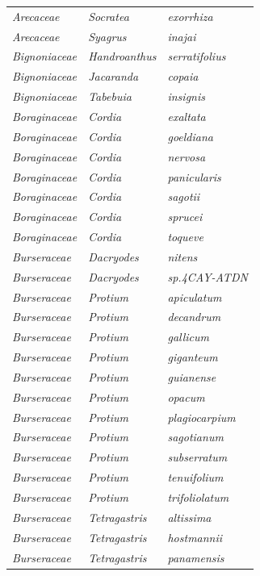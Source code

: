 \documentclass[fleqn,10pt]{ArtEcoFoG} %
\begin{document}
\begin{table}[t]
\begin{tabular}{lll}
\em{Arecaceae} & \em{Socratea} & \em{exorrhiza}\\
\em{Arecaceae} & \em{Syagrus} & \em{inajai}\\
\em{Bignoniaceae} & \em{Handroanthus} & \em{serratifolius}\\
\addlinespace
\em{Bignoniaceae} & \em{Jacaranda} & \em{copaia}\\
\em{Bignoniaceae} & \em{Tabebuia} & \em{insignis}\\
\em{Boraginaceae} & \em{Cordia} & \em{exaltata}\\
\em{Boraginaceae} & \em{Cordia} & \em{goeldiana}\\
\em{Boraginaceae} & \em{Cordia} & \em{nervosa}\\
\addlinespace
\em{Boraginaceae} & \em{Cordia} & \em{panicularis}\\
\em{Boraginaceae} & \em{Cordia} & \em{sagotii}\\
\em{Boraginaceae} & \em{Cordia} & \em{sprucei}\\
\em{Boraginaceae} & \em{Cordia} & \em{toqueve}\\
\em{Burseraceae} & \em{Dacryodes} & \em{nitens}\\
\addlinespace
\em{Burseraceae} & \em{Dacryodes} & \em{sp.4CAY-ATDN}\\
\em{Burseraceae} & \em{Protium} & \em{apiculatum}\\
\em{Burseraceae} & \em{Protium} & \em{decandrum}\\
\em{Burseraceae} & \em{Protium} & \em{gallicum}\\
\em{Burseraceae} & \em{Protium} & \em{giganteum}\\
\addlinespace
\em{Burseraceae} & \em{Protium} & \em{guianense}\\
\em{Burseraceae} & \em{Protium} & \em{opacum}\\
\em{Burseraceae} & \em{Protium} & \em{plagiocarpium}\\
\em{Burseraceae} & \em{Protium} & \em{sagotianum}\\
\em{Burseraceae} & \em{Protium} & \em{subserratum}\\
\addlinespace
\em{Burseraceae} & \em{Protium} & \em{tenuifolium}\\
\em{Burseraceae} & \em{Protium} & \em{trifoliolatum}\\
\em{Burseraceae} & \em{Tetragastris} & \em{altissima}\\
\em{Burseraceae} & \em{Tetragastris} & \em{hostmannii}\\
\em{Burseraceae} & \em{Tetragastris} & \em{panamensis}\\

\end{tabular}
\end{table}
\end{document}
